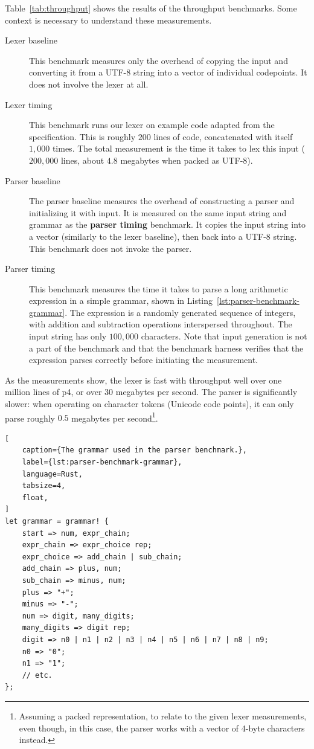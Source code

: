 Table~\ref{tab:throughput} shows the results of the throughput benchmarks. Some
context is necessary to understand these measurements.

\begin{description}
	\item[Lexer baseline] This benchmark measures only the overhead of copying
		the input and converting it from a UTF-8 string into a vector of
		individual codepoints. It does not involve the lexer at all.
	\item[Lexer timing] This benchmark runs our lexer on example \pfs code
		adapted from the specification\cite{p416:v123:spec}. This is roughly
		\(200\) lines of code, concatenated with itself \(1,000\) times. The
		total measurement is the time it takes to lex this input (\(200,000\)
		lines, about \(4.8\) megabytes when packed as UTF-8).
	\item[Parser baseline] The parser baseline measures the overhead of
		constructing a parser and initializing it with input. It is measured on
		the same input string and grammar as the \textbf{parser timing}
		benchmark. It copies the input string into a vector (similarly to the
		lexer baseline), then back into a UTF-8 string. This benchmark does not
		invoke the parser.
	\item[Parser timing] This benchmark measures the time it takes to parse a
		long arithmetic expression in a simple grammar, shown in
		Listing~\ref{lst:parser-benchmark-grammar}. The expression is a randomly
		generated sequence of integers, with addition and subtraction operations
		interspersed throughout. The input string has only \(100,000\)
		characters. Note that input generation is not a part of the benchmark
		and that the benchmark harness verifies that the expression parses
		correctly before initiating the measurement.
\end{description}

As the measurements show, the lexer is fast with throughput well over one
million lines of \acrshort{p4}, or over \(30\) megabytes per second. The parser
is significantly slower: when operating on character tokens (Unicode code
points), it can only parse roughly \(0.5\) megabytes per
second\footnote{Assuming a packed representation, to relate to the given lexer
measurements, even though, in this case, the parser works with a vector of
4-byte characters instead.}.

\begin{lstlisting}[
	caption={The grammar used in the parser benchmark.},
	label={lst:parser-benchmark-grammar},
	language=Rust,
	tabsize=4,
	float,
]
let grammar = grammar! {
	start => num, expr_chain;
	expr_chain => expr_choice rep;
	expr_choice => add_chain | sub_chain;
	add_chain => plus, num;
	sub_chain => minus, num;
	plus => "+";
	minus => "-";
	num => digit, many_digits;
	many_digits => digit rep;
	digit => n0 | n1 | n2 | n3 | n4 | n5 | n6 | n7 | n8 | n9;
	n0 => "0";
	n1 => "1";
	// etc.
};
\end{lstlisting}

